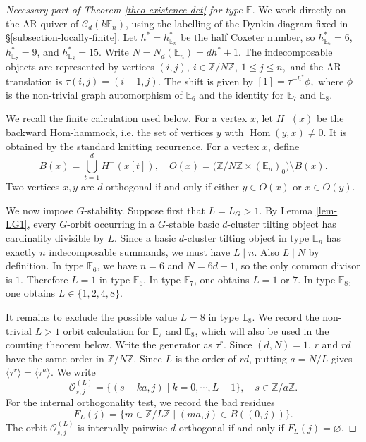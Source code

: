 \documentclass[12pt]{article}
\theoremstyle{plain}
\theoremstyle{definition}
\DeclareMathOperator{\Hom}{Hom}
\renewcommand{\leq}{\leqslant}
\begin{document}
\begin{proof}[Necessary part of Theorem \ref{theo-existence-dct} for type $\mathbb{E}$]
We work directly on the AR-quiver of \(\mathcal C_d(k\mathbb E_n)\), using the
labelling of the Dynkin diagram fixed in \S \ref{subsection-locally-finite}.
Let
\(h^*=h_{\mathbb E_n}^*\)
be the half Coxeter number, so \(h_{\mathbb E_6}^*=6\),
\(h_{\mathbb E_7}^*=9\), and \(h_{\mathbb E_8}^*=15\).  Write
\(N=N_d(\mathbb E_n)=dh^*+1.\)
The indecomposable objects are represented by vertices
\((i,j),\ i\in\mathbb Z/N\mathbb Z,\ 1\leq j\leq n,\)
and the AR-translation is \(\tau(i,j)=(i-1,j)\).  The shift is given by
\([1]=\tau^{-h^*}\phi,\)
where \(\phi\) is the non-trivial graph automorphism of \(\mathbb E_6\) and the
identity for \(\mathbb E_7\) and \(\mathbb E_8\).


We recall the finite calculation used below.  For a vertex \(x\), let
\(H^-(x)\) be the backward Hom-hammock, i.e. the set of vertices \(y\) with
\(\Hom(y,x)\neq0\).  It is obtained by the standard knitting recurrence.  For a
vertex \(x\), define
\[
B(x)=\bigcup_{t=1}^d H^-(x[t]),\quad
O(x)=\bigl(\mathbb Z/N\mathbb Z\times(\mathbb E_n)_0\bigr)\setminus B(x).
\]
Two vertices \(x,y\) are \(d\)-orthogonal if and only if either
\(y\in O(x)\) or \(x\in O(y)\).  

We now impose \(G\)-stability.  Suppose first that \(L=L_G>1\).  By Lemma
\ref{lem-LG1}, every \(G\)-orbit occurring in a \(G\)-stable basic
\(d\)-cluster tilting object has cardinality divisible by \(L\).  Since a
basic \(d\)-cluster tilting object in type \(\mathbb E_n\) has exactly \(n\)
indecomposable summands, we must have
\(L\mid n\). Also \(L\mid N\) by definition.  In type \(\mathbb E_6\), we have
\(n=6\) and \(N=6d+1\), so the only common divisor is \(1\).  Therefore
\(L=1\) in type \(\mathbb E_6\).  In type \(\mathbb E_7\), one obtains
\(L=1\) or \(7\).  In type \(\mathbb E_8\), one obtains
\(L\in\{1,2,4,8\}\).

It
remains to exclude the possible value \(L=8\) in type \(\mathbb E_8\).  We
 record the non-trivial \(L>1\) orbit calculation for
\(\mathbb E_7\) and \(\mathbb E_8\), which will also be used in the counting
theorem below. Write the generator as \(\tau^r\).
Since \((d,N)=1\), \(r\) and \(rd\) have the same order in
\(\mathbb Z/N\mathbb Z\). Since \(L\) is the order of \(rd\), putting \(a=N/L\)
gives \(\langle\tau^r\rangle=\langle\tau^a\rangle\).  We write
	\[
	\mathcal O_{s,j}^{(L)}
	=
	\{(s-ka,j)\mid k=0,\cdots,L-1\},
	\quad s\in\mathbb Z/a\mathbb Z .
	\]
	For the internal orthogonality test, we record
	the bad residues
	\[F_L(j) = \{m\in\mathbb Z/L\mathbb Z\mid (ma,j)\in B((0,j))\}.\]
The orbit $\mathcal O_{s,j}^{(L)}$ is internally pairwise $d$-orthogonal if and only if $F_L(j)=\varnothing$. 



\end{proof}
\end{document}
